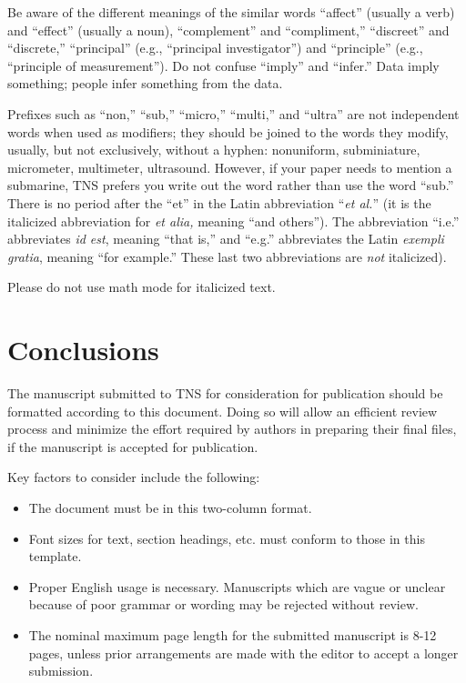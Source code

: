\documentclass{IEEEtran}
\begin{document}
Be aware of the different meanings of the similar words ``affect'' (usually
a verb) and ``effect'' (usually a noun), ``complement'' and ``compliment,''
``discreet'' and ``discrete,'' ``principal'' (e.g., ``principal
investigator'') and ``principle'' (e.g., ``principle of measurement''). Do
not confuse ``imply'' and ``infer.'' Data imply something; people infer
something from the data.

Prefixes such as ``non,'' ``sub,'' ``micro,'' ``multi,'' and ``ultra'' are
not independent words when used as modifiers; they should be joined to the
words they modify, usually, but not exclusively, without a hyphen:
nonuniform, subminiature, micrometer, multimeter, ultrasound. However, if
your paper needs to mention a submarine, TNS prefers you write out the word
rather than use the word ``sub.'' There is no period after the ``et'' in the
Latin abbreviation ``\textit{et al.}'' (it is the italicized abbreviation for \textit{et alia,} meaning
``and others''). The abbreviation ``i.e.'' abbreviates \textit{id est}, meaning ``that
is,'' and ``e.g.'' abbreviates the Latin \textit{exempli gratia}, meaning ``for example.'' These
last two abbreviations are \textit{not} italicized).

Please do not use math mode for italicized text.

\section{Conclusions}
The manuscript submitted to TNS for consideration for publication should be
formatted according to this document. Doing so will allow an efficient
review process and minimize the effort required by authors in preparing
their final files, if the manuscript is accepted for publication.

Key factors to consider include the following:

\begin{itemize}
\item The document must be in this two-column format.
\item Font sizes for text, section headings, etc. must conform to those in this template.
\item Proper English usage is necessary. Manuscripts which are vague or unclear because of poor grammar or wording may be rejected without review.
\item The nominal maximum page length for the submitted manuscript is 8-12 pages, unless prior arrangements are made with the editor to accept a longer submission.
\end{itemize}
\end{document}
